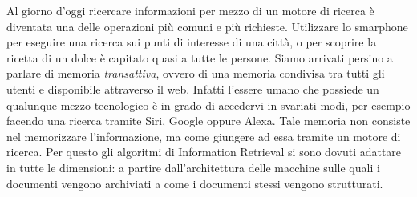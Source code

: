 Al giorno d'oggi ricercare informazioni per mezzo di un motore di ricerca è diventata una delle operazioni più comuni e più richieste.  Utilizzare lo smarphone per
eseguire una ricerca sui punti di interesse di una città, o per scoprire la ricetta di un dolce è capitato quasi a tutte le persone. Siamo arrivati persino a parlare di memoria \textit{transattiva}, ovvero di una memoria condivisa tra tutti gli utenti e disponibile attraverso il web. Infatti l'essere umano che possiede un qualunque mezzo tecnologico è in grado di accedervi in svariati modi, per esempio facendo una ricerca tramite Siri, Google oppure Alexa.
Tale memoria non consiste nel memorizzare l'informazione, ma come giungere ad essa tramite un motore di ricerca.
Per questo gli algoritmi di Information Retrieval si sono dovuti adattare in tutte le dimensioni: a partire dall'architettura delle macchine sulle quali i documenti vengono archiviati a come i documenti stessi vengono strutturati.
